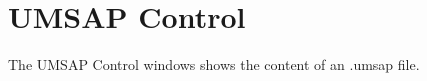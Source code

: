 \chapter{UMSAP Control}
\label{chap:umsapCtrl}

The UMSAP Control windows shows the content of an .umsap file.